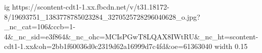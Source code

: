  
 
 
 
 

\par
\ifcmt
  ig https://scontent-cdt1-1.xx.fbcdn.net/v/t31.18172-8/19693751_1383778785023284_3270525728296040628_o.jpg?_nc_cat=106&ccb=1-4&_nc_sid=e3f864&_nc_ohc=MCIsPGwT8LQAX8IWtRU&_nc_ht=scontent-cdt1-1.xx&oh=2bb1f60036d0c2319d62a16999d7c4fd&oe=61363040
  width 0.15
\fi


